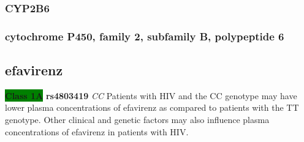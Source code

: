 \documentclass{book}
\begin{document}
\subsubsection{ CYP2B6 }
\subsubsection{ cytochrome P450, family 2, subfamily B, polypeptide 6 }

\subsection{ efavirenz }


\begin{center}



\textbf{\colorbox{green} {Class 1A}} \textbf{ rs4803419 } \textit{ CC }
Patients with HIV and the CC genotype may have lower plasma concentrations of efavirenz as compared to patients with the TT genotype. Other clinical and genetic factors may also influence plasma concentrations of efavirenz in patients with HIV.

\end{center}
\end{document}
